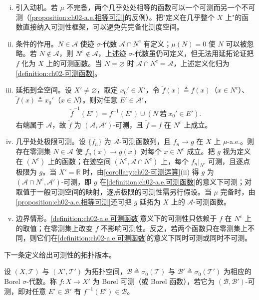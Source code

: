 \documentclass[../../main.tex]{subfiles}%
\begin{document}
\begin{remark}\label{remark:ch02-a.e.极限可测}\label{remark:ch02-几乎处处}
\begin{enumerate}[(i)]
\item 引入动机。若 $\mu$ 不完备，两个几乎处处相等的函数可以一个可测而另一个不可测（\cref{proposition:ch02-a.e.相等可测}的反例）。把"定义在几乎整个 $X$ 上"的函数直接纳入可测性框架，可以避免先完备化测度空间。
\item 条件的作用。$N\in\mathscr A$ 使迹 $\sigma$-代数 $\mathscr A\cap N^c$ 有定义；$\mu(N)=0$ 使 $N$ 可以被忽略。若 $N\notin\mathscr A$，则 $N^c\notin\mathscr A$，上述迹 $\sigma$-代数虽仍可定义，但无法用延拓论证把 $f$ 化为 $X$ 上的可测函数。当 $N=\varnothing$ 时 $\mathscr A\cap N^c=\mathscr A$，上述定义化归为\cref{definition:ch02-可测函数}。
\item 延拓到全空间。设 $X'\neq\varnothing$，取定 $x_0'\in X'$，令 $\tilde f(x)\triangleq f(x)$（$x\in N^c$）、$\tilde f(x)\triangleq x_0'$（$x\in N$）。则对任意 $E'\in\mathscr A'$，
\begin{align*}
\tilde f^{-1}(E')=f^{-1}(E')\cup(N\ \text{若}\ x_0'\in E').
\end{align*}
右端属于 $\mathscr A$，故 $\tilde f$ 为 $(\mathscr A,\mathscr A')$-可测，且 $\tilde f=f$ 在 $N^c$ 上成立。
\item 几乎处处极限可测。设 $\{f_n\}$ 为 $\mathscr A$-可测函数列，且 $f_n\to g$ 在 $X$ 上 $\mu$-a.e.。则存在零测集 $N\in\mathscr A$ 使 $f_n(x)\to g(x)$ 对每个 $x\in N^c$ 成立。把 $g$ 视为定义在 $(N^c)$ 上的函数；在迹空间 $(N^c,\mathscr A\cap N^c)$ 上，每个 $f_n|_{N^c}$ 可测，且逐点极限为 $g$。当 $X'=\mathbb{R}$ 时，由\cref{corollary:ch02-可测运算}(ii) 得 $g$ 为 $(\mathscr A\cap N^c,\mathscr A')$-可测，即 $g$ 在\cref{definition:ch02-a.e.可测函数}的意义下可测；对取值于一般可测空间的映射，逐点极限的可测性需另行假设。当 $\mu$ 完备时，由\cref{proposition:ch02-a.e.相等可测}还可把 $g$ 延拓为 $X$ 上的 $\mathscr A$-可测函数。
\item 边界情形。\cref{definition:ch02-a.e.可测函数}意义下的可测性只依赖于 $f$ 在 $N^c$ 上的取值；在零测集上改变 $f$ 不影响可测性。反之，若两个函数只在零测集上不同，则它们在\cref{definition:ch02-a.e.可测函数}的意义下同时可测或同时不可测。
\end{enumerate}
\end{remark}

下一条定义给出可测性的拓扑版本。

\begin{definition}\label{definition:ch02-Borel函数}
设 $(X,\mathscr T)$ 与 $(X',\mathscr T')$ 为拓扑空间，$\mathscr B\triangleq\sigma_0(\mathscr T)$ 与 $\mathscr B'\triangleq\sigma_0(\mathscr T')$ 为相应的 Borel $\sigma$-代数。称 $f:X\to X'$ 为 Borel 可测（或 Borel 函数），若它为 $(\mathscr B,\mathscr B')$-可测，即对任意 $E'\in\mathscr B'$ 有 $f^{-1}(E')\in\mathscr B$。
\end{definition}
\end{document}
